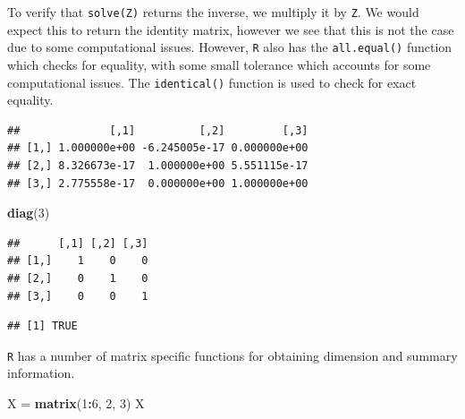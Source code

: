 \documentclass[]{book}
\newenvironment{Shaded}{\begin{snugshade}}{\end{snugshade}}
\newcommand{\KeywordTok}[1]{\textcolor[rgb]{0.13,0.29,0.53}{\textbf{#1}}}
\newcommand{\DecValTok}[1]{\textcolor[rgb]{0.00,0.00,0.81}{#1}}
\newcommand{\StringTok}[1]{\textcolor[rgb]{0.31,0.60,0.02}{#1}}
\newcommand{\OperatorTok}[1]{\textcolor[rgb]{0.81,0.36,0.00}{\textbf{#1}}}
\newcommand{\NormalTok}[1]{#1}
\theoremstyle{definition}
\theoremstyle{definition}
\theoremstyle{definition}
\theoremstyle{remark}
\begin{document}
To verify that \texttt{solve(Z)} returns the inverse, we multiply it by
\texttt{Z}. We would expect this to return the identity matrix, however
we see that this is not the case due to some computational issues.
However, \texttt{R} also has the \texttt{all.equal()} function which
checks for equality, with some small tolerance which accounts for some
computational issues. The \texttt{identical()} function is used to check
for exact equality.

\begin{Shaded}
\end{Shaded}

\begin{verbatim}
##              [,1]          [,2]         [,3]
## [1,] 1.000000e+00 -6.245005e-17 0.000000e+00
## [2,] 8.326673e-17  1.000000e+00 5.551115e-17
## [3,] 2.775558e-17  0.000000e+00 1.000000e+00
\end{verbatim}

\begin{Shaded}
\begin{Highlighting}[]
\KeywordTok{diag}\NormalTok{(}\DecValTok{3}\NormalTok{)}
\end{Highlighting}
\end{Shaded}

\begin{verbatim}
##      [,1] [,2] [,3]
## [1,]    1    0    0
## [2,]    0    1    0
## [3,]    0    0    1
\end{verbatim}

\begin{Shaded}
\end{Shaded}

\begin{verbatim}
## [1] TRUE
\end{verbatim}

\texttt{R} has a number of matrix specific functions for obtaining
dimension and summary information.

\begin{Shaded}
\begin{Highlighting}[]
\NormalTok{X =}\StringTok{ }\KeywordTok{matrix}\NormalTok{(}\DecValTok{1}\OperatorTok{:}\DecValTok{6}\NormalTok{, }\DecValTok{2}\NormalTok{, }\DecValTok{3}\NormalTok{)}
\NormalTok{X}
\end{Highlighting}
\end{Shaded}
\end{document}

